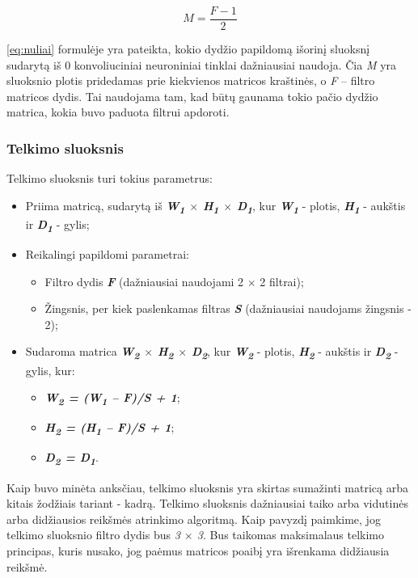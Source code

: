 \documentclass{VUMIFInfKursinis}
\begin{document}
\begin{equation}\label{eq:nuliai}
M=\frac{F-1}{2}
\end{equation}

\ref{eq:nuliai} formulėje yra pateikta, kokio dydžio papildomą išorinį sluoksnį sudarytą iš 0 konvoliuciniai neuroniniai tinklai dažniausiai naudoja. Čia \textit{M} yra sluoksnio plotis pridedamas prie kiekvienos matricos kraštinės, o \textit{F} – filtro matricos dydis. Tai naudojama tam, kad būtų gaunama tokio pačio dydžio matrica, kokia buvo paduota filtrui apdoroti.


\subsubsection{Telkimo sluoksnis}

Telkimo sluoksnis turi tokius parametrus:
\begin{itemize}
	\item Priima matricą, sudarytą iš \textit{\textbf{W\textsubscript{1} $\times$ H\textsubscript{1} $\times$ D\textsubscript{1}}}, kur \textit{\textbf{W\textsubscript{1}}} - plotis, \textit{\textbf{H\textsubscript{1}}} - aukštis ir \textit{\textbf{D\textsubscript{1}}} - gylis;
	\item Reikalingi papildomi parametrai:
	\begin{itemize}
		\item Filtro dydis \textbf{\textit{F}} (dažniausiai naudojami 2 $\times$ 2 filtrai);
		\item Žingsnis, per kiek paslenkamas filtras \textbf{\textit{S}} (dažniausiai naudojams žingsnis - 2);
	\end{itemize}
	\item Sudaroma matrica \textit{\textbf{W\textsubscript{2} $\times$ H\textsubscript{2} $\times$ D\textsubscript{2}}}, kur \textit{\textbf{W\textsubscript{2}}} - plotis, \textit{\textbf{H\textsubscript{2}}} - aukštis ir \textit{\textbf{D\textsubscript{2}}} - gylis, kur:
	\begin{itemize}
		\item \textit{\textbf{W\textsubscript{2} = (W\textsubscript{1} – F)/S + 1}};
		\item \textit{\textbf{H\textsubscript{2} = (H\textsubscript{1} – F)/S + 1}};
		\item \textit{\textbf{D\textsubscript{2} = D\textsubscript{1}}}.
	\end{itemize}
\end{itemize}


Kaip buvo minėta anksčiau, telkimo sluoksnis yra skirtas sumažinti matricą arba kitais žodžiais tariant - kadrą. Telkimo sluoksnis dažniausiai taiko arba vidutinės arba didžiausios reikšmės atrinkimo algoritmą. Kaip pavyzdį paimkime, jog telkimo sluoksnio filtro dydis bus \textit{3 $\times$ 3}. Bus taikomas maksimalaus telkimo principas, kuris nusako, jog paėmus matricos poaibį yra išrenkama didžiausia reikšmė.
\end{document}
